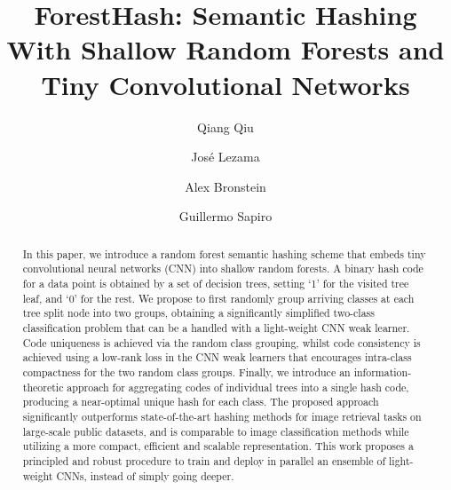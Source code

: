 \documentclass[runningheads]{llncs}
\begin{document}
%
\title{ForestHash: Semantic Hashing With Shallow Random Forests and Tiny Convolutional Networks}

%

\author{Qiang Qiu \and
Jos\'e Lezama \and
Alex Bronstein \and
Guillermo Sapiro}
%
%

%
\maketitle              %
%
\begin{abstract}
In this paper, we introduce a random forest semantic hashing scheme that embeds
tiny convolutional neural networks (CNN) into shallow random forests.  A binary
hash code for a data point is obtained by a set of decision trees, setting `1'
for the visited tree leaf, and `0' for the rest.  We propose to first randomly
group arriving classes at each tree split node into two groups, obtaining a
significantly simplified two-class classification problem that can be a handled
with a light-weight CNN weak learner. Code uniqueness is achieved via the random
class grouping, whilst code consistency is achieved using a low-rank loss in the
CNN weak learners that encourages intra-class compactness for the two random class
groups. Finally, we introduce an information-theoretic approach for aggregating
codes of individual trees into a single hash code, producing a near-optimal
unique hash for each class. The proposed approach significantly outperforms
state-of-the-art hashing methods for image retrieval tasks on large-scale public
datasets, and is comparable to image classification methods while utilizing a
more compact, efficient and scalable representation. This work proposes a
principled and robust procedure to train and deploy in parallel an ensemble of
light-weight CNNs, instead of simply going deeper.
%
\end{abstract}
%
%
%
\end{document}
